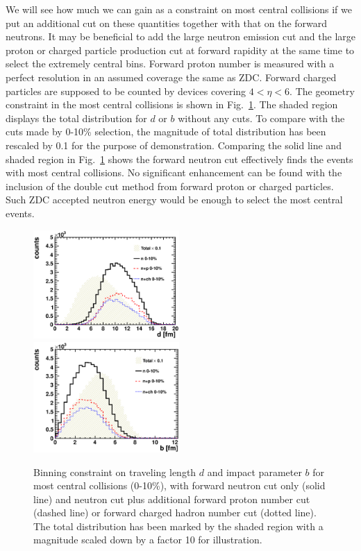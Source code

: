 We will see how much we can gain as a constraint on
most central collisions if we put an additional cut on these quantities together
with that on the forward neutrons. It may be beneficial to add the large neutron emission cut
and the large proton or charged particle production cut at forward rapidity at
the same time to select the extremely central bins. Forward proton number is
measured with a perfect resolution in an assumed coverage the same as ZDC.
Forward charged particles are supposed to be counted by devices covering
$4<\eta<6$. The geometry constraint in the most central collisions is
shown in Fig.~\ref{fig:geoConstrain_central}. The shaded region displays the total
distribution for $d$ or $b$ without any cuts. To compare with the cuts made by
0-10\% selection, the magnitude of total distribution has been rescaled by 0.1 for the purpose of
demonstration. Comparing the solid line and shaded region in
Fig.~\ref{fig:geoConstrain_central} shows the forward neutron cut effectively finds
the events with most central collisions. No significant enhancement can be found
with the inclusion of the double cut method from forward proton or charged
particles. Such ZDC accepted neutron energy would be enough to select
the most central events.
\begin{figure} 
\begin{center} 
\includegraphics[width=0.495\textwidth]{plots/chpt7/tau9_mostCentral_dist.eps} \label{fig:travelConstrain_central} 
\includegraphics[width=0.495\textwidth]{plots/chpt7/tau9_mostCentral_bimpact.eps} \label{fig:bimpConstrain_central} 
\caption[The most central bin under a double cut method]
{Binning constraint on traveling length $d$ and impact parameter $b$ for most
central collisions (0-10\%), with forward neutron cut only (solid line) and
neutron cut plus additional forward proton number cut (dashed line) or forward
charged hadron number cut (dotted line). The total distribution has been marked by
the shaded region with a magnitude scaled down by a factor 10 for illustration.
}
\label{fig:geoConstrain_central}
\end{center} 
\end{figure}


